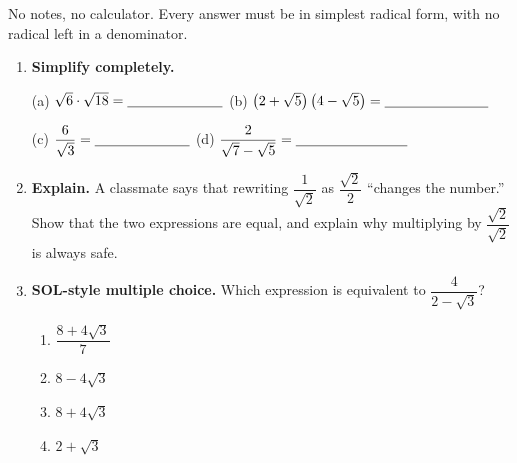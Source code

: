 \documentclass[10pt]{article}
\begin{document}
\namedateperiod

\vspace{0.10in}

No notes, no calculator. Every answer must be in simplest radical form, with no radical left in a
denominator.

\begin{enumerate}[leftmargin=1.8em, itemsep=10pt]
  \item \textbf{Simplify completely.}

        \vspace{4pt}
        (a) $\sqrt{6}\cdot\sqrt{18} = \blank{2.4cm}$ \hspace{0.4in}
        (b) $\left(2+\sqrt{5}\right)\left(4-\sqrt{5}\right) = \blank{2.6cm}$

        \vspace{6pt}
        (c) $\dfrac{6}{\sqrt{3}} = \blank{2.4cm}$ \hspace{0.55in}
        (d) $\dfrac{2}{\sqrt{7}-\sqrt{5}} = \blank{2.8cm}$

  \item \textbf{Explain.} A classmate says that rewriting $\dfrac{1}{\sqrt{2}}$ as
        $\dfrac{\sqrt{2}}{2}$ ``changes the number.'' Show that the two expressions are equal, and
        explain why multiplying by $\dfrac{\sqrt{2}}{\sqrt{2}}$ is always safe.

  \item \textbf{SOL-style multiple choice.} Which expression is equivalent to
        $\dfrac{4}{2-\sqrt{3}}$?
        \begin{enumerate}[label=\Alph*., leftmargin=1.9em, itemsep=1pt]
          \item $\dfrac{8+4\sqrt{3}}{7}$
          \item $8-4\sqrt{3}$
          \item $8+4\sqrt{3}$
          \item $2+\sqrt{3}$
        \end{enumerate}
\end{enumerate}
\end{document}

